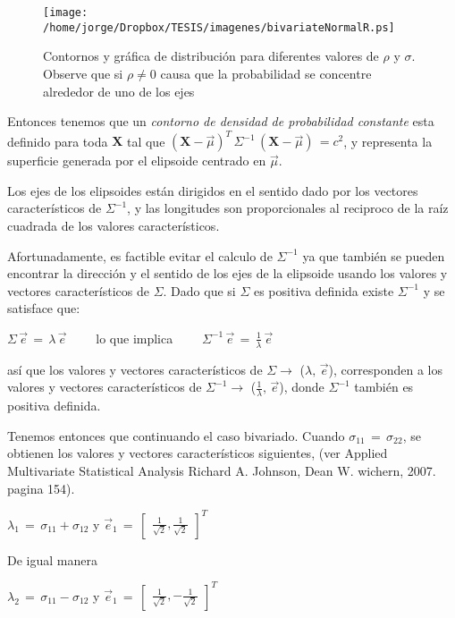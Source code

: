\documentclass[english]{report}
\begin{document}
\begin{figure}[H]
\centering
\texttt{[image: /home/jorge/Dropbox/TESIS/imagenes/bivariateNormalR.ps]}
\caption{Contornos y gráfica de distribución para diferentes valores de $\rho$ y $\sigma$. Observe que si $\rho \neq 0$ causa que la probabilidad se concentre alrededor de uno de los ejes}
\label{c2f4}
\end{figure}


Entonces tenemos que un \emph{contorno de densidad de probabilidad constante} esta definido para toda $\textbf{X}$ tal que $(\textbf{X}-\vec{\mu})^T\,\Sigma^{-1}\,(\textbf{X}-\vec{\mu})\,=c^2$, y representa la superficie generada por el elipsoide centrado en $\vec{\mu}$.

Los ejes de los elipsoides están dirigidos en el sentido dado por los vectores característicos de $\Sigma^{-1}$, y las longitudes son proporcionales al reciproco de la raíz cuadrada de los valores característicos.

Afortunadamente, es factible evitar el calculo de $\Sigma^{-1}$ ya que también se pueden encontrar la dirección y el sentido de los ejes de la elipsoide usando los valores y vectores característicos de $\Sigma$. Dado que si $\Sigma$ es positiva definida existe $\Sigma^{-1}$ y se satisface que:


$\Sigma\,\vec{e}\,=\,\lambda\,\vec{e}\qquad$ lo que implica $\qquad\Sigma^{-1}\,\vec{e}\,=\,\frac{1}{\lambda}\,\vec{e}$


así que los valores y vectores característicos de $\Sigma\rightarrow$ ($\lambda,\,\vec{e}$), corresponden a los valores y vectores característicos de $\Sigma^{-1}\rightarrow$ ($\frac{1}{\lambda},\,\vec{e}$), donde $\Sigma^{-1}$ también es positiva definida.


Tenemos entonces que continuando el caso bivariado. Cuando $\sigma_{11}\,=\,\sigma_{22}$, se obtienen los valores y vectores característicos siguientes, (ver Applied Multivariate Statistical Analysis Richard A. Johnson, Dean W. wichern, 2007. pagina 154).

$\lambda_1\,=\,\sigma_{11}+\sigma_{12}$ y $\vec{e}_1\,=\,\begin{bmatrix}
\frac{1}{\sqrt{2}},
\frac{1}{\sqrt{2}}
\end{bmatrix}^T$

De igual manera 

$\lambda_2\,=\,\sigma_{11}-\sigma_{12}$ y $\vec{e}_1\,=\,\begin{bmatrix}
\frac{1}{\sqrt{2}},-\frac{1}{\sqrt{2}}
\end{bmatrix}^T$
\end{document}
